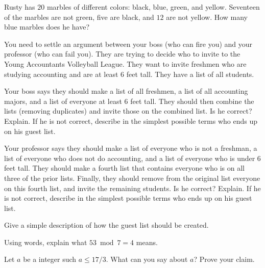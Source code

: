 \begin{pro} Rusty has $20$ marbles of different colors: black, blue, green,  and yellow. 
Seventeen of the marbles are not
green, five are black, and $12$ are not yellow. How many blue
marbles does he have?
\end{pro}

\begin{pro}
You need to settle an argument between your boss (who can fire you) and your professor (who can fail you).  They are trying to decide who to invite to the Young Accountants Volleyball League.  They want to invite freshmen who are studying accounting and are at least 6 feet tall.  They have a list of all students.
\begin{lenum}
\item
Your boss says they should make a list of all freshmen, a list of all accounting majors, and a list of everyone at least 6 feet tall.  They should then combine the lists (removing duplicates) and invite those on the combined list. 
Is he correct?  Explain.  If he is not correct, describe in the simplest possible terms who ends up on his guest list.
\item
Your professor says they should make a list of everyone who is not a freshman, a list of everyone who does not do accounting, and a list of everyone who is under 6 feet tall. They should make a fourth list that contains everyone who is on all three of the prior lists.  Finally, they should remove from the original list everyone on this fourth list, and invite the remaining students.
Is he correct?  Explain.  If he is not correct, describe in the simplest possible terms who ends up on his guest list.
\item
Give a simple description of how the guest list should be created.
\end{lenum}
\end{pro}

\begin{pro}
Using words, explain what $53 \bmod 7 = 4$ means.
\end{pro}

\begin{pro}
Let $a$ be a integer such $a\leq 17/3$. What can you say about $a$?  Prove your claim.
\end{pro}

